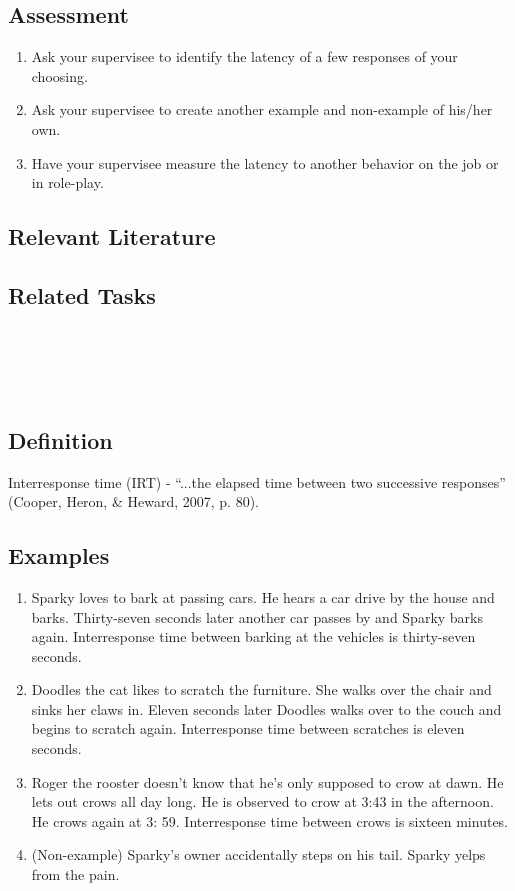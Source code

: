 \subsection{Assessment}
\begin{enumerate}
\item Ask your supervisee to identify the latency of a few responses of your choosing.  
\item Ask your supervisee to create another example and non-example of his/her own.
\item Have your supervisee measure the latency to another behavior on the job or in role-play.
\end{enumerate}
%
\subsection{Relevant Literature}
\begin{refsection}
\nocite{cooper2007applied,thomason2011response}
\printbibliography[heading=none]
\end{refsection}

\subsection{Related Tasks}
\fourhOne{}\\
\fouriOne{}\\
\fourFKFourtySeven{}\\
%
%
%
%
%
%
%
%
\section{\fouraFive{}}
\subsection{Definition}  
Interresponse time (IRT) - ``...the elapsed time between two successive responses'' (Cooper, Heron, \& Heward, 2007, p. 80).
%  
\subsection{Examples} 
\begin{enumerate}
\item Sparky loves to bark at passing cars.  He hears a car drive by the house and barks.  Thirty-seven seconds later another car passes by and Sparky barks again.  Interresponse time between barking at the vehicles is thirty-seven seconds.
\item Doodles the cat likes to scratch the furniture.  She walks over the chair and sinks her claws in.  Eleven seconds later Doodles walks over to the couch and begins to scratch again.  Interresponse time between scratches is eleven seconds.  
\item Roger the rooster doesn't know that he's only supposed to crow at dawn. He lets out crows all day long.  He is observed to crow at 3:43 in the afternoon.  He crows again at 3: 59.  Interresponse time between crows is sixteen minutes.  
\item (Non-example) Sparky's owner accidentally steps on his tail.  Sparky yelps from the pain. 
\end{enumerate}
%
